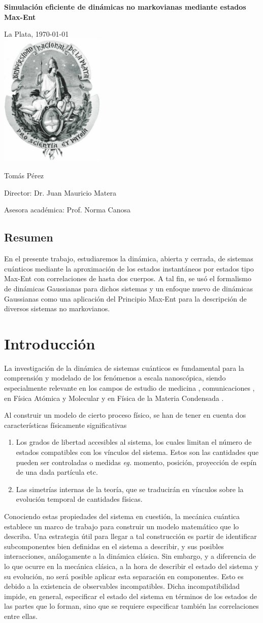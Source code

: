 \documentclass{report} %
\providecommand{\HUGE}{\Huge}%
\newlength{\drop}%
\newcommand{\eg}{\textit{eg. }}
\newcommand{\titleLL}{
\pagestyle{empty}
\begingroup%
\drop=0.1\textheight
\fboxsep 0.9\baselineskip
\sffamily
\vspace*{\drop}
\centering
{\textcolor{Dark}{\HUGE \bf Simulación eficiente de 
dinámicas no
markovianas 
mediante estados Max-Ent}}\par

\vfill
{\small La Plata, \today \\ \includegraphics[width=5cm]{escudo-UNLP.jpg}}\par
\vspace*{.2\drop}
{\Large Tom\'as P\'erez}\par
\vspace{.2\drop}
{\Large Director: Dr. Juan Mauricio Matera}\par\vspace*{.1\drop}
{\Large Asesora académica: Prof. Norma Canosa}\par
\vfill


\vspace*{\drop}
\endgroup
\clearpage
\hspace{1cm}
\newpage
\pagestyle{plain}
}
\numberwithin{equation}{section}
\begin{document}
\titleLL
\clearpage
\newpage
\tableofcontents
\newpage

\section*{Resumen}

En el presente trabajo, estudiaremos la dinámica, abierta y cerrada, de sistemas cuánticos mediante la aproximación de los estados instantáneos por estados tipo Max-Ent con correlaciones de hasta dos cuerpos. A tal fin, se usó el formalismo de dinámicas Gaussianas para dichos sistemas y un enfoque nuevo de dinámicas Gaussianas como una aplicación del Principio Max-Ent para la descripción de diversos sistemas no markovianos.  
 
\clearpage

\chapter{Introducci\'on}

La investigación de la dinámica de sistemas cuánticos es fundamental para la comprensión y modelado de los fenómenos a escala nanoscópica, siendo especialmente relevante en los campos de estudio de medicina \cite{PCHP.10}, comunicaciones  \cite{Caldeira1981, Chirolli2008, Burkard2009, Tan2011}, en Física Atómica y Molecular y en Física de la Materia Condensada \cite{Zhou2017, Breuer2016,HOPS,TEDOPA,DAMPF,Farina2019}.

Al construir un modelo de cierto proceso físico, se han de tener en cuenta dos características físicamente significativas

\begin{enumerate}
    \item Los grados de libertad accesibles al sistema, los cuales limitan el número de estados compatibles con los vínculos del sistema. Estos son las cantidades que pueden ser controladas o medidas \eg momento, posición, proyección de espín de una dada partícula etc.
    \item Las simetrías internas de la teoría, que se traducirán en vínculos sobre la evolución temporal de cantidades físicas.
\end{enumerate}

Conociendo estas propiedades del sistema en cuestión, la mecánica cuántica establece un marco de trabajo para construir un modelo matemático que lo describa. Una estrategia útil para llegar a tal construcción es partir de identificar subcomponentes bien definidas en el sistema a describir, y sus posibles interacciones, análogamente a la dinámica clásica. Sin embargo, y a diferencia de lo que ocurre en la mecánica clásica, a la hora de describir el estado del sistema y su evolución, no será posible aplicar esta separación en componentes. Esto es debido a la existencia de observables incompatibles. Dicha incompatibilidad impide, en general, especificar el estado del sistema en términos de los estados de las partes que lo forman, sino que se requiere especificar también las correlaciones entre ellas. 
\end{document}
